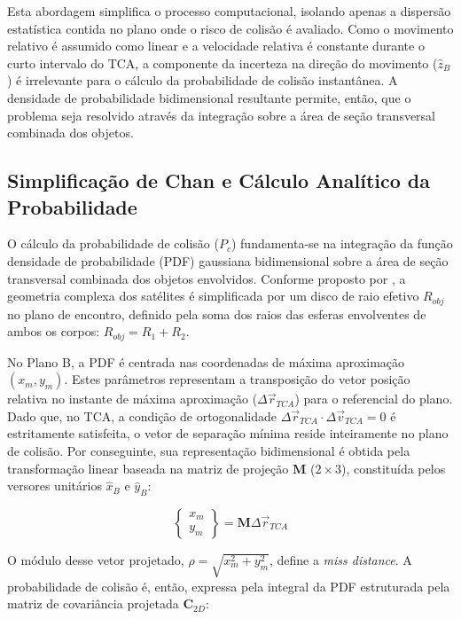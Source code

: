 Esta abordagem simplifica o processo computacional, isolando apenas a dispersão estatística contida no plano onde o risco de colisão é avaliado. Como o movimento relativo é assumido como linear e a velocidade relativa é constante durante o curto intervalo do TCA, a componente da incerteza na direção do movimento ($\hat{z}_B$) é irrelevante para o cálculo da probabilidade de colisão instantânea. A densidade de probabilidade bidimensional resultante permite, então, que o problema seja resolvido através da integração sobre a área de seção transversal combinada dos objetos.

\subsection{Simplificação de Chan e Cálculo Analítico da Probabilidade}

O cálculo da probabilidade de colisão ($P_c$) fundamenta-se na integração da função densidade de probabilidade (PDF) gaussiana bidimensional sobre a área de seção transversal combinada dos objetos envolvidos. Conforme proposto por , a geometria complexa dos satélites é simplificada por um disco de raio efetivo $R_{obj}$ no plano de encontro, definido pela soma dos raios das esferas envolventes de ambos os corpos: $R_{obj} = R_1 + R_2$.

No Plano B, a PDF é centrada nas coordenadas de máxima aproximação $(x_m, y_m)$. Estes parâmetros representam a transposição do vetor posição relativa no instante de máxima aproximação ($\Delta \vec{r}_{TCA}$) para o referencial do plano. Dado que, no TCA, a condição de ortogonalidade $\Delta \vec{r}_{TCA} \cdot \Delta \vec{v}_{TCA} = 0$ é estritamente satisfeita, o vetor de separação mínima reside inteiramente no plano de colisão. Por conseguinte, sua representação bidimensional é obtida pela transformação linear baseada na matriz de projeção $\mathbf{M}$ ($2 \times 3$), constituída pelos versores unitários $\hat{x}_B$ e $\hat{y}_B$:

\begin{equation}
    \begin{Bmatrix} x_m \\ y_m \end{Bmatrix} = \mathbf{M} \Delta \vec{r}_{TCA}
\end{equation}

O módulo desse vetor projetado, $\rho = \sqrt{x_m^2 + y_m^2}$, define a \textit{miss distance}. A probabilidade de colisão é, então, expressa pela integral da PDF estruturada pela matriz de covariância projetada $\mathbf{C}_{2D}$:

